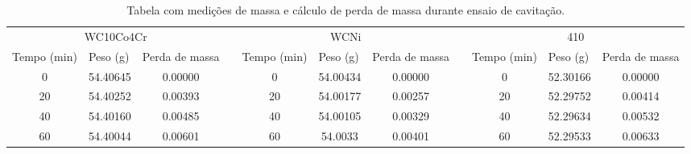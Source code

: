 \begin{table}[]
\centering
\caption{Tabela com medições de massa e cálculo de perda de massa durante ensaio de cavitação.}
\label{tab:cav_hvof2}
\begin{tabular}{ccccccccccc}
\cline{1-3} \cline{5-7} \cline{9-11}
\multicolumn{3}{c}{WC10Co4Cr}                                                                           &                       & \multicolumn{3}{c}{WCNi}                                                                               &                       & \multicolumn{3}{c}{410}                                                                                \\ \cline{1-3} \cline{5-7} \cline{9-11} 
\multicolumn{1}{|l|}{Tempo (min)} & \multicolumn{1}{l|}{Peso (g)} & \multicolumn{1}{l|}{Perda de massa} & \multicolumn{1}{l|}{} & \multicolumn{1}{l|}{Tempo (min)} & \multicolumn{1}{l|}{Peso (g)} & \multicolumn{1}{l|}{Perda de massa} & \multicolumn{1}{l|}{} & \multicolumn{1}{l|}{Tempo (min)} & \multicolumn{1}{l|}{Peso (g)} & \multicolumn{1}{l|}{Perda de massa} \\ \cline{1-3} \cline{5-7} \cline{9-11} 
\multicolumn{1}{|c|}{0}           & \multicolumn{1}{c|}{54.40645} & \multicolumn{1}{c|}{0.00000}        & \multicolumn{1}{l|}{} & \multicolumn{1}{c|}{0}           & \multicolumn{1}{c|}{54.00434} & \multicolumn{1}{c|}{0.00000}        & \multicolumn{1}{l|}{} & \multicolumn{1}{c|}{0}           & \multicolumn{1}{c|}{52.30166} & \multicolumn{1}{c|}{0.00000}        \\ \cline{1-3} \cline{5-7} \cline{9-11} 
\multicolumn{1}{|c|}{20}          & \multicolumn{1}{c|}{54.40252} & \multicolumn{1}{c|}{0.00393}        & \multicolumn{1}{l|}{} & \multicolumn{1}{c|}{20}          & \multicolumn{1}{c|}{54.00177} & \multicolumn{1}{c|}{0.00257}        & \multicolumn{1}{l|}{} & \multicolumn{1}{c|}{20}          & \multicolumn{1}{c|}{52.29752} & \multicolumn{1}{c|}{0.00414}        \\ \cline{1-3} \cline{5-7} \cline{9-11} 
\multicolumn{1}{|c|}{40}          & \multicolumn{1}{c|}{54.40160} & \multicolumn{1}{c|}{0.00485}        & \multicolumn{1}{l|}{} & \multicolumn{1}{c|}{40}          & \multicolumn{1}{c|}{54.00105} & \multicolumn{1}{c|}{0.00329}        & \multicolumn{1}{l|}{} & \multicolumn{1}{c|}{40}          & \multicolumn{1}{c|}{52.29634} & \multicolumn{1}{c|}{0.00532}        \\ \cline{1-3} \cline{5-7} \cline{9-11} 
\multicolumn{1}{|c|}{60}          & \multicolumn{1}{c|}{54.40044} & \multicolumn{1}{c|}{0.00601}        & \multicolumn{1}{l|}{} & \multicolumn{1}{c|}{60}          & \multicolumn{1}{c|}{54.0033}  & \multicolumn{1}{c|}{0.00401}        & \multicolumn{1}{l|}{} & \multicolumn{1}{c|}{60}          & \multicolumn{1}{c|}{52.29533} & \multicolumn{1}{c|}{0.00633}        \\ \cline{1-3} \cline{5-7} \cline{9-11} 

\end{tabular}
\end{table}
